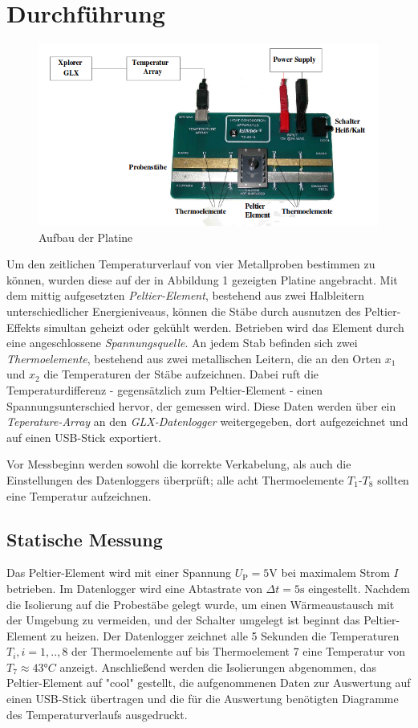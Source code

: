 \newpage
\section{Durchführung}
\label{sec:Durchführung}
\begin{figure}
	\label{fig:platine}
	\centering
	\includegraphics[width=\textwidth]{Bilder/Aufbau.png}
	\caption{Aufbau der Platine}
\end{figure}

Um den zeitlichen Temperaturverlauf von vier Metallproben bestimmen zu können, wurden diese auf der in Abbildung 1 gezeigten Platine angebracht. Mit dem mittig aufgesetzten \emph{Peltier-Element}, bestehend aus zwei Halbleitern unterschiedlicher Energieniveaus, können die Stäbe durch ausnutzen des Peltier-Effekts simultan geheizt oder gekühlt werden. Betrieben wird das Element durch eine angeschlossene \emph{Spannungsquelle}. 
An jedem Stab befinden sich zwei \emph{Thermoelemente}, bestehend aus zwei metallischen Leitern, die an den Orten $x_1$ und $x_2$ die Temperaturen der Stäbe aufzeichnen. Dabei ruft die Temperaturdifferenz - gegensätzlich zum Peltier-Element - einen Spannungsunterschied hervor, der gemessen wird. Diese Daten werden über ein \emph{Teperature-Array} an den \emph{GLX-Datenlogger} weitergegeben, dort aufgezeichnet und auf einen USB-Stick exportiert. 

Vor Messbeginn werden sowohl die korrekte Verkabelung, als auch die Einstellungen des Datenloggers überprüft; alle acht Thermoelemente $T_\mathup{1}$-$T_\mathup{8}$ sollten eine Temperatur aufzeichnen.

\subsection{Statische Messung}

Das Peltier-Element wird mit einer Spannung $U_\mathup{P}=5 \si{\volt}$ bei maximalem Strom $I$ betrieben. Im Datenlogger wird eine Abtastrate von $\Delta{t}=5\si{\second}$ eingestellt. Nachdem die Isolierung auf die Probestäbe gelegt wurde, um einen Wärmeaustausch mit der Umgebung zu vermeiden, und der Schalter umgelegt ist beginnt das Peltier-Element zu heizen. Der Datenlogger zeichnet alle 5 Sekunden die Temperaturen $T_i, i=1,..,8$ der Thermoelemente auf bis Thermoelement 7 eine Temperatur von $T_\mathup{7}\approx 43°C$ anzeigt. Anschließend werden die Isolierungen abgenommen, das Peltier-Element auf "cool" gestellt, die aufgenommenen Daten zur Auswertung auf einen USB-Stick übertragen und die für die Auswertung benötigten Diagramme des Temperaturverlaufs ausgedruckt.

